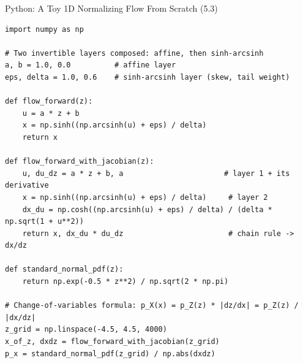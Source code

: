 \documentclass[aspectratio=169,10pt]{beamer}
\begin{document}
\begin{frame}[fragile]{Python: A Toy 1D Normalizing Flow From Scratch (5.3)}
\begin{lstlisting}[style=pycode]
import numpy as np

# Two invertible layers composed: affine, then sinh-arcsinh
a, b = 1.0, 0.0          # affine layer
eps, delta = 1.0, 0.6    # sinh-arcsinh layer (skew, tail weight)

def flow_forward(z):
    u = a * z + b
    x = np.sinh((np.arcsinh(u) + eps) / delta)
    return x

def flow_forward_with_jacobian(z):
    u, du_dz = a * z + b, a                       # layer 1 + its derivative
    x = np.sinh((np.arcsinh(u) + eps) / delta)     # layer 2
    dx_du = np.cosh((np.arcsinh(u) + eps) / delta) / (delta * np.sqrt(1 + u**2))
    return x, dx_du * du_dz                        # chain rule -> dx/dz

def standard_normal_pdf(z):
    return np.exp(-0.5 * z**2) / np.sqrt(2 * np.pi)

# Change-of-variables formula: p_X(x) = p_Z(z) * |dz/dx| = p_Z(z) / |dx/dz|
z_grid = np.linspace(-4.5, 4.5, 4000)
x_of_z, dxdz = flow_forward_with_jacobian(z_grid)
p_x = standard_normal_pdf(z_grid) / np.abs(dxdz)
\end{lstlisting}
\end{frame}

\end{document}
